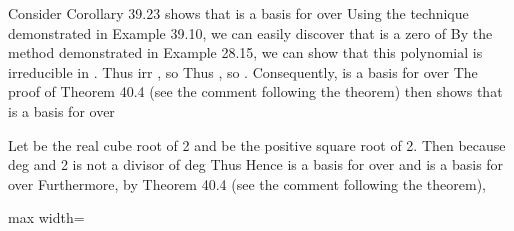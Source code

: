\documentclass[11pt,oneside]{article}
\begin{document}
\begin{BookBody}
\end{BookBody}

\BookNarrativetrue

\begin{BookBody}

 Consider  Corollary 39.23 shows that  is a basis for  over  Using the technique demonstrated in Example 39.10, we can easily discover that  is a zero of  By the method demonstrated in Example 28.15, we can show that this polynomial is irreducible in . Thus irr , so  Thus , so . Consequently,  is a basis for  over  The proof of Theorem 40.4 (see the comment following the theorem) then shows that  is a basis for  over \BookEnd{\blacktriangle}

 Let  be the real cube root of 2 and  be the positive square root of 2. Then  because deg and 2 is not a divisor of  deg Thus  Hence  is a basis for  over  and  is a basis for  over  Furthermore, by Theorem 40.4 (see the comment following the theorem),

\begin{center}\begin{adjustbox}{max width=\linewidth}\end{adjustbox}\end{center}


\end{BookBody}
\end{document}

